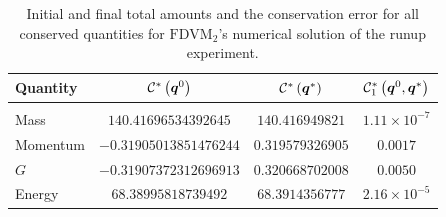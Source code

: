 \begin{table}
	\centering
	\begin{tabular}{l  c  c c}
		Quantity& $\mathcal{C}^*\left(\boldsymbol{q}^0\right)$ & $\mathcal{C}^*\left(\boldsymbol{q}^*\right)$ & $\mathcal{C}^*_1\left(\boldsymbol{q}^0,\boldsymbol{q}^*\right)$ \\
		\hline &&& \\
		Mass & $140.41696534392645$ & $140.416949821$ & $1.11\times 10^{-7}$\\
		Momentum & $-0.31905013851476244$ & $0.319579326905$ & $0.0017$\\
		$G$ & $-0.31907372312696913$ & $0.320668702008$ & $0.0050$\\
		Energy & $68.38995818739492$ & $68.3914356777 $ & $2.16 \times 10^{-5}$ \\
	\end{tabular}
	\caption{Initial and final total amounts and the conservation error for all conserved quantities for $\text{FDVM}_2$'s numerical solution of the runup experiment.}
	\label{tab:ConservationSynFDVM}
\end{table}

